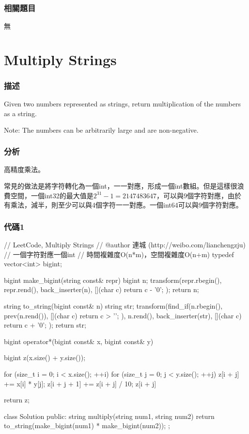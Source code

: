 \subsubsection{相關題目}

\begindot
\item 無
\myenddot


\section{Multiply Strings} %
\label{sec:multiply-strings}


\subsubsection{描述}
Given two numbers represented as strings, return multiplication of the numbers as a string.

Note: The numbers can be arbitrarily large and are non-negative.


\subsubsection{分析}
高精度乘法。

常見的做法是將字符轉化為一個int，一一對應，形成一個int數組。但是這樣很浪費空間，一個int32的最大值是$2^{31}-1=2147483647$，可以與9個字符對應，由於有乘法，減半，則至少可以與4個字符一一對應。一個int64可以與9個字符對應。


\subsubsection{代碼1}
\begin{Code}
// LeetCode, Multiply Strings
// @author 連城 (http://weibo.com/lianchengzju)
// 一個字符對應一個int
// 時間複雜度O(n*m)，空間複雜度O(n+m)
typedef vector<int> bigint;

bigint make_bigint(string const& repr) {
    bigint n;
    transform(repr.rbegin(), repr.rend(), back_inserter(n),
            [](char c) { return c - '0'; });
    return n;
}

string to_string(bigint const& n) {
    string str;
    transform(find_if(n.rbegin(), prev(n.rend()),
            [](char c) { return c > '\0'; }), n.rend(), back_inserter(str),
            [](char c) { return c + '0'; });
    return str;
}

bigint operator*(bigint const& x, bigint const& y) {
    bigint z(x.size() + y.size());

    for (size_t i = 0; i < x.size(); ++i)
        for (size_t j = 0; j < y.size(); ++j) {
            z[i + j] += x[i] * y[j];
            z[i + j + 1] += z[i + j] / 10;
            z[i + j] %
        }

    return z;
}

class Solution {
public:
    string multiply(string num1, string num2) {
        return to_string(make_bigint(num1) * make_bigint(num2));
    }
};
\end{Code}


